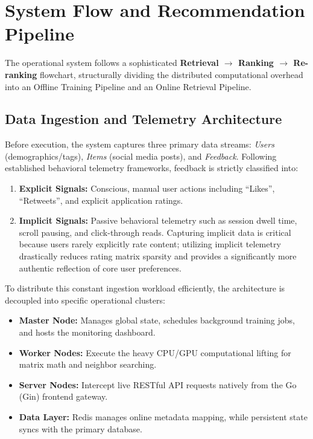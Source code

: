 \section{System Flow and Recommendation Pipeline}
The operational system follows a sophisticated \textbf{Retrieval $\rightarrow$ Ranking $\rightarrow$ Re-ranking} flowchart, structurally dividing the distributed computational overhead into an Offline Training Pipeline and an Online Retrieval Pipeline.

\subsection{Data Ingestion and Telemetry Architecture}
Before execution, the system captures three primary data streams: \textit{Users} (demographics/tags), \textit{Items} (social media posts), and \textit{Feedback}. Following established behavioral telemetry frameworks, feedback is strictly classified into:
\begin{enumerate}
    \item \textbf{Explicit Signals:} Conscious, manual user actions including ``Likes'', ``Retweets'', and explicit application ratings.
    \item \textbf{Implicit Signals:} Passive behavioral telemetry such as session dwell time, scroll pausing, and click-through reads. Capturing implicit data is critical because users rarely explicitly rate content; utilizing implicit telemetry drastically reduces rating matrix sparsity and provides a significantly more authentic reflection of core user preferences.
\end{enumerate}

To distribute this constant ingestion workload efficiently, the architecture is decoupled into specific operational clusters:
\begin{itemize}
    \item \textbf{Master Node:} Manages global state, schedules background training jobs, and hosts the monitoring dashboard.
    \item \textbf{Worker Nodes:} Execute the heavy CPU/GPU computational lifting for matrix math and neighbor searching.
    \item \textbf{Server Nodes:} Intercept live RESTful API requests natively from the Go (Gin) frontend gateway.
    \item \textbf{Data Layer:} Redis manages online metadata mapping, while persistent state syncs with the primary database.
\end{itemize}

